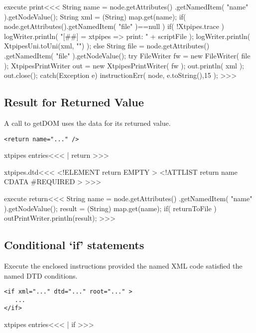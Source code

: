 \documentclass{article}
\begin{document}
{\<execute print\><<<
String name = node.getAttributes()
                 .getNamedItem( "name" ).getNodeValue();
String xml = (String) map.get(name);
if( node.getAttributes().getNamedItem( "file" )==null ){
   if( !Xtpipes.trace ){
      logWriter.println( "[##]  = xtpipes => print: " + scriptFile );
   }
   logWriter.println( XtpipesUni.toUni(xml, "") );
} else {
   String file = node.getAttributes()
                 .getNamedItem( "file" ).getNodeValue();
   try{ 
       FileWriter fw = new FileWriter( file ); 
       XtpipesPrintWriter out = new XtpipesPrintWriter( fw ); 
       out.println( xml ); 
       out.close(); 
   } catch(Exception e){   
       instructionErr( node, e.toString(),15 );   
}  }
>>>




\subsection{Result for Returned Value}

A call to getDOM uses the data for its returned value.

\begin{verbatim}
<return name="..." />
\end{verbatim}



\<xtpipes entries\><<<
| return
>>>


\<xtpipes.dtd\><<<
<!ELEMENT return EMPTY >  
<!ATTLIST return
          name CDATA #REQUIRED 
>
>>>



\<execute return\><<<
String name = node.getAttributes()
                 .getNamedItem( "name" ).getNodeValue();
result = (String) map.get(name);
if( returnToFile ){
   outPrintWriter.println(result);
}
>>>




\subsection{Conditional `if' statements}

Execute the enclosed instructions provided the named XML code 
satisfied the named DTD conditions. 
 
\begin{verbatim}
<if xml="..." dtd="..." root="..." >  
   ...
</if>
\end{verbatim}


\<xtpipes entries\><<<
| if
>>>


}
\end{document}
